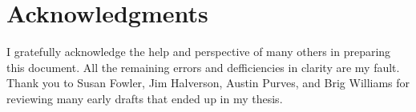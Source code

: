 \section*{Acknowledgments}
\label{sec:acknowledgments}


I gratefully acknowledge the help and perspective of many others in preparing
this document.  All the remaining errors and defficiencies in clarity are my fault.
Thank you to Susan Fowler, Jim Halverson, Austin Purves, and Brig Williams
for reviewing many early drafts that ended up in my thesis.




